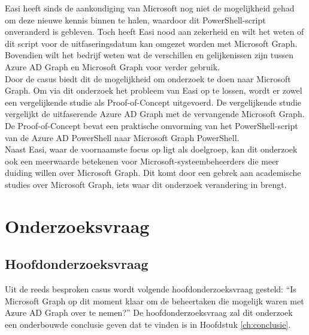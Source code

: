 Easi heeft sinds de aankondiging van Microsoft nog niet de mogelijkheid gehad om deze nieuwe kennis binnen te halen, waardoor dit PowerShell-script onveranderd is gebleven. Toch heeft Easi nood aan zekerheid en wilt het weten of dit script voor de uitfaseringsdatum kan omgezet worden met Microsoft Graph. Bovendien wilt het bedrijf weten wat de verschillen en gelijkenissen zijn tussen Azure \ac{AD} Graph en Microsoft Graph voor verder gebruik. \\

Door de casus biedt dit de mogelijkheid om onderzoek te doen naar Microsoft Graph. Om via dit onderzoek het probleem van Easi op te lossen, wordt er zowel een vergelijkende studie als Proof-of-Concept uitgevoerd. De vergelijkende studie vergelijkt de uitfaserende Azure \Ac{AD} Graph met de vervangende Microsoft Graph. De Proof-of-Concept bevat een praktische omvorming van het PowerShell-script van de Azure \Ac{AD} PowerShell naar Microsoft Graph PowerShell. \\

Naast Easi, waar de voornaamste focus op ligt als doelgroep, kan dit onderzoek ook een meerwaarde betekenen voor Microsoft-systeembeheerders die meer duiding willen over Microsoft Graph. Dit komt door een gebrek aan academische studies over Microsoft Graph, iets waar dit onderzoek verandering in brengt. 

\section{Onderzoeksvraag}
\label{sec:onderzoeksvraag}

\begin{comment}
Wees zo concreet mogelijk bij het formuleren van je onderzoeksvraag. Een onderzoeksvraag is trouwens iets waar nog niemand op dit moment een antwoord heeft (voor zover je kan nagaan). Het opzoeken van bestaande informatie (bv. ``welke tools bestaan er voor deze toepassing?'') is dus geen onderzoeksvraag. Je kan de onderzoeksvraag verder specifiëren in deelvragen. Bv.~als je onderzoek gaat over performantiemetingen, dan 
\end{comment}

\subsection{Hoofdonderzoeksvraag}

Uit de reeds besproken casus wordt volgende hoofdonderzoeksvraag gesteld: “Is Microsoft Graph op dit moment klaar om de beheertaken die mogelijk waren met Azure \ac{AD} Graph over te nemen?” De hoofdonderzoeksvraag zal dit onderzoek een onderbouwde conclusie geven dat te vinden is in Hoofdstuk \ref{ch:conclusie}.

